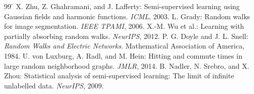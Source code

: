 {\renewcommand{\refname}{付録の参考文献}
\begin{thebibliography}{99}
\footnotesize{}\h\setlength{\itemsep}{0pt}\setlength{\parskip}{0pt}\setlength{\parsep}{0pt}
 X. Zhu, Z. Ghahramani, and J. Lafferty: Semi-supervised learning using Gaussian fields and harmonic functions. \textit{ICML}, 2003.
 L. Grady: Random walks for image segmentation. \textit{IEEE TPAMI}, 2006.
 X.-M. Wu et al.: Learning with partially absorbing random walks. \textit{NeurIPS}, 2012.
 P. G. Doyle and J. L. Snell: \textit{Random Walks and Electric Networks}. Mathematical Association of America, 1984.
 U. von Luxburg, A. Radl, and M. Hein: Hitting and commute times in large random neighborhood graphs. \textit{JMLR}, 2014.
 B. Nadler, N. Srebro, and X. Zhou: Statistical analysis of semi-supervised learning: The limit of infinite unlabelled data. \textit{NeurIPS}, 2009.
\end{thebibliography}}
